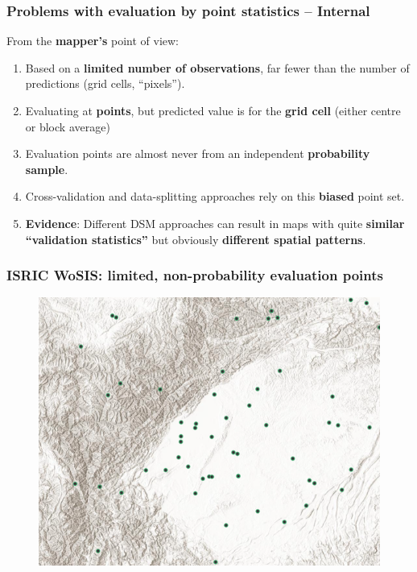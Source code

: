 \documentclass[aspectratio=169, 10pt]{beamer}
\begin{document}
\begin{frame}
  \frametitle{Problems with evaluation by point statistics -- Internal}
From the \textbf{mapper's} point of view:
\begin{enumerate}
    \item Based on a \textbf{limited number of observations}, far fewer than the number of predictions (grid cells, ``pixels'').
    \item Evaluating at \textbf{points}, but predicted value is for the \textbf{grid cell} (either centre or block average)
    \item Evaluation points are almost never from an independent  \textbf{probability sample}.
  \item Cross-validation and data-splitting approaches rely on this \textbf{biased} point set.
  \item \textbf{Evidence}: Different DSM approaches can result in maps    with quite \textbf{similar ``validation statistics''} but obviously \textbf{different spatial patterns}.
  \end{enumerate}
\end{frame}


\begin{frame}
  \frametitle{ISRIC WoSIS: limited, non-probability evaluation points}
\begin{figure}
    \centering
\includegraphics[height=0.65\textheight]{./graphics_david/SoilGridsProfiles_Chengdu.png}
\end{figure}
\end{frame}
\end{document}
